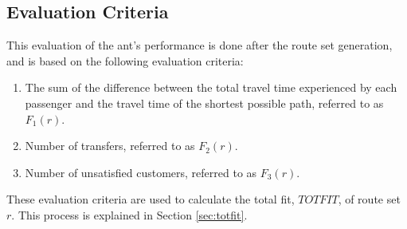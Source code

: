 \subsection{Evaluation Criteria} 
This evaluation of the ant's performance is done after the route set generation, and is based on the following evaluation criteria:
\begin{enumerate}
\item \label{itm:criteriaTotalTravelTime} The sum of the difference between the total travel time experienced by each passenger and the travel time of the shortest possible path, referred to as $F_1(r)$.
\item \label{itm:f2} Number of transfers, referred to as $F_2(r)$.
\item Number of unsatisfied customers, referred to as $F_3(r)$. 
\end{enumerate}
These evaluation criteria are used to calculate the total fit, $TOTFIT$, of route set $r$. This process is explained in Section \vref{sec:totfit}.



